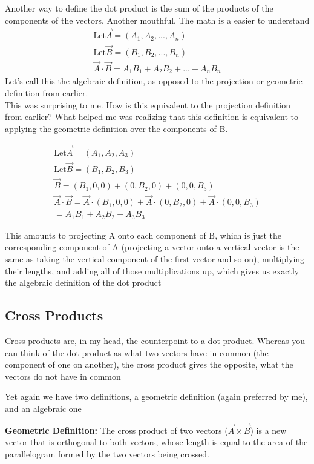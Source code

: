\documentclass[12pt, letterpaper]{article}
\begin{document}
Another way to define the dot product is the sum of the products of the components of the vectors. Another mouthful. The math is a easier to understand
\begin{gather*}
    \text{Let} \vec{A} = (A_1, A_2, ..., A_n)\\
    \text{Let} \vec{B} = (B_1, B_2, ..., B_n)\\
    \vec{A} \cdot \vec{B} = A_1 B_1 + A_2 B_2 + ... + A_n B_n
\end{gather*}
Let's call this the algebraic definition, as opposed to the projection or geometric definition from earlier.\\
This was surprising to me. How is this equivalent to the projection definition from earlier?
What helped me was realizing that this definition is equivalent to applying the geometric definition over the components of B.

\begin{gather*}
    \text{Let} \vec{A} = (A_1, A_2, A_3)\\
    \text{Let} \vec{B} = (B_1, B_2, B_3)\\
    \vec{B} = (B_1, 0, 0) + (0, B_2, 0) + (0, 0, B_3)\\
    \vec{A} \cdot \vec{B} =  \vec{A} \cdot (B_1, 0, 0) + \vec{A} \cdot (0, B_2, 0) + \vec{A} \cdot (0, 0, B_3)\\
    = A_1 B_1 + A_2 B_2 + A_3 B_3
\end{gather*}

This amounts to projecting A onto each component of B, which is just the corresponding component of A (projecting a vector onto a vertical vector is the same as taking the vertical component of the first vector and so on), 
multiplying their lengths, and adding all of those multiplications up, which gives us exactly the algebraic definition of the dot product


\subsection{Cross Products}
Cross products are, in my head, the counterpoint to a dot product. Whereas you can think of the dot product as what two vectors have in common (the component of one on another), the cross product gives the opposite, what the vectors do not have in common

Yet again we have two definitions, a geometric definition (again preferred by me), and an algebraic one

\textbf{Geometric Definition:} The cross product of two vectors ($\vec{A} \times \vec{B}$) is a new vector that is orthogonal to both vectors, whose length is equal to the area of the parallelogram formed by the two vectors being crossed.
\end{document}
